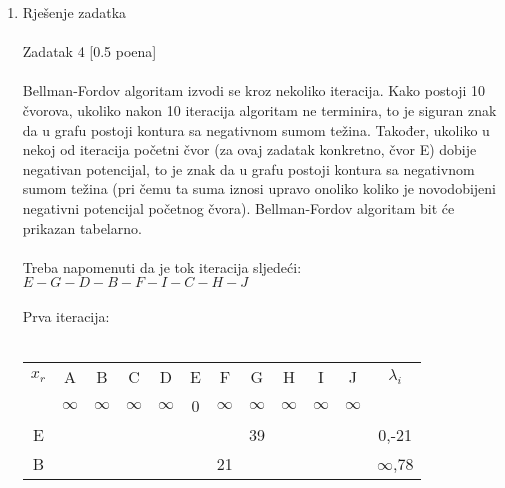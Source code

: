 \documentclass[12pt]{article}
\begin{document}
\begin{enumerate}
\item Rješenje zadatka \\
\\
Zadatak 4 [0.5 poena] \\
\\
Bellman-Fordov algoritam izvodi se kroz nekoliko iteracija. Kako postoji 10 čvorova, ukoliko
nakon 10 iteracija algoritam ne terminira, to je siguran znak da u grafu postoji kontura sa
negativnom sumom težina. Također, ukoliko u nekoj od iteracija početni čvor (za ovaj zadatak
konkretno, čvor E) dobije negativan potencijal, to je znak da u grafu postoji kontura sa negativnom
sumom težina (pri čemu ta suma iznosi upravo onoliko koliko je novodobijeni negativni potencijal
početnog čvora). Bellman-Fordov algoritam bit će prikazan tabelarno.
\\
\\
Treba napomenuti da je tok iteracija sljedeći: $E - G - D - B - F - I - C - H - J$ \\
\\
Prva iteracija:
\\
\\
\begin{tabular}{|c|c|c|c|c|c|c|c|c|c|c|c|}
\hline
$x_r$ & A                               & B                               & C                               & D                               & E                          & F                               & G                               & H                               & I                               & J                               & $\lambda_i$                           \\ \cline{2-11}
      & {\color[HTML]{000000} $\infty$} & {\color[HTML]{000000} $\infty$} & {\color[HTML]{000000} $\infty$} & {\color[HTML]{000000} $\infty$} & {\color[HTML]{000000} 0}   & {\color[HTML]{000000} $\infty$} & {\color[HTML]{000000} $\infty$} & {\color[HTML]{000000} $\infty$} & {\color[HTML]{000000} $\infty$} & {\color[HTML]{000000} $\infty$} & {\color[HTML]{000000} }               \\ \hline
E     & {\color[HTML]{000000} }         & {\color[HTML]{000000} }         & {\color[HTML]{000000} }         & {\color[HTML]{000000} }         & {\color[HTML]{000000} }    & {\color[HTML]{000000} }         & {\color[HTML]{FE0000} 39}       & {\color[HTML]{000000} }         & {\color[HTML]{000000} }         & {\color[HTML]{000000} }         & {\color[HTML]{000000} 0,-21}          \\ \hline
B     & {\color[HTML]{000000} }         & {\color[HTML]{000000} }         & {\color[HTML]{000000} }         & {\color[HTML]{000000} }         & {\color[HTML]{000000} }    & {\color[HTML]{FE0000} 21}       & {\color[HTML]{000000} }         & {\color[HTML]{000000} }         & {\color[HTML]{000000} }         & {\color[HTML]{000000} }         & {\color[HTML]{000000} $\infty$,78}    \\ \hline

\end{tabular}
\end{enumerate}
\end{document}
